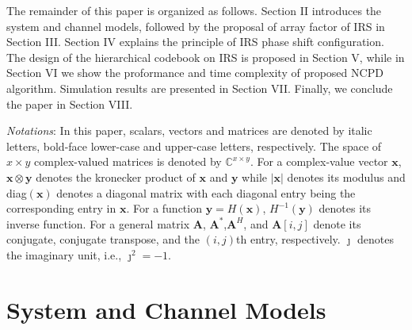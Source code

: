 \documentclass[12pt,draftclsnofoot,onecolumn]{IEEEtran}
\begin{document}
	
	The remainder of this paper is organized as follows. Section II 	introduces the system and channel models, followed by the proposal of  array factor of IRS in Section III.  Section IV explains the principle of IRS phase shift configuration.  The design of the hierarchical codebook on IRS is proposed in Section V, while in Section VI we show the proformance and time complexity of proposed NCPD algorithm. Simulation results are presented in Section VII. Finally, we conclude the paper
	in Section VIII.
	
	{\itshape Notations}: In this paper, scalars, vectors and matrices are denoted by italic letters, bold-face lower-case and upper-case letters, respectively. The space of ${ x} \times { y}$ complex-valued matrices is denoted by $\mathbb{C}^{{x} \times { y}}$. For a complex-value vector $\bm x$, ${\bm x}\otimes{\bm y}$ denotes the  kronecker product of $\bm x$ and $\bm y$ while  $|{\bm x}|$ denotes its  modulus and diag$({\bm x})$ denotes a diagonal matrix with each diagonal entry being the corresponding entry in $\bm x$.  For a function ${\bm y}=H({\bm x})$, $H^{-1}({\bm y})$ denotes its inverse function. For a general matrix $\bm A$, ${\bm A}^*$,${\bm A}^H$, and ${\bm A}[i,j]$ denote its conjugate, conjugate transpose, and the $(i,j)$th entry, respectively. $\jmath$ denotes the imaginary unit, i.e., ${\jmath}^2=-1$.  
	
	\section{System   and Channel Models   }
	
\end{document}
